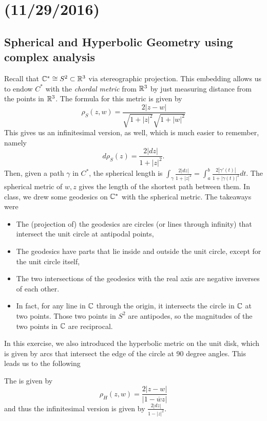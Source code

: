 \documentclass[11pt,leqno,oneside]{amsart}
\numberwithin{thm}{section}
\newcommand{\D}{\mathbb{D}}
\begin{document}
  \section{(11/29/2016)}
  \subsection*{Spherical and Hyperbolic Geometry using complex
    analysis}

  Recall that ${\mathbb C}^* \mathrel{\cong} S^2 \subset {\mathbb R}^3$ via stereographic
  projection. This embedding allows us to endow $C^*$ with the
  \emph{chordal metric} from ${\mathbb R}^3$ by just measuring distance from
  the points in ${\mathbb R}^3$. The formula for this metric is given by \[
    \rho_S(z,w) = \frac{2|z-w|}{\sqrt{1+|z|^2} \sqrt{1+|w|^2}}
  \]
  This gives us an infinitesimal version, as well, which is much easier
  to remember, namely \[
    d\rho_S(z) = \frac{2|dz|}{1+|z|^2}.
  \]
  Then, given a path $\gamma$ in $C^*$, the spherical length is
  $\int_\gamma \frac{2|dz|}{1+|z|^2} = \int_a^b
  \frac{2|\gamma'(t)|}{1+|\gamma(t)|^2}dt$. The spherical metric
  of $w,z$ gives the length of the shortest path between them. In
  class, we drew some geodesics on ${\mathbb C}^*$ with the spherical
  metric. The takeaways were
  \begin{itemize}
  \item The (projection of) the geodesics are circles (or lines through infinity) that
    intersect the unit circle at antipodal points,
  \item The geodesics have parts that lie inside and outside the unit
    circle, except for the unit circle itself,
  \item The two intersections of the geodesics with the real axis are
    negative inverses of each other.
  \item In fact, for any line in ${\mathbb C}$ through the origin, it intersects the circle in ${\mathbb C}$ at two points.  Those two points in $S^2$ are antipodes, so the magnitudes of the two points in ${\mathbb C}$ are reciprocal.
  \end{itemize}
  In this exercise, we also introduced the hyperbolic metric on the
  unit disk, which is given by arcs that intersect the edge of the
  circle at 90 degree angles. This leads us to the following
  \begin{defn}
    The \de{pseudohyperbolic metric on $\D$} is given by \[
      \rho_H(z,w) = \frac{2|z-w|}{|1-\overline{w}z|}
    \]
    and thus the infinitesimal version is given by
    $\frac{2|dz|}{1-|z|^2}$.
  \end{defn}
\end{document}

